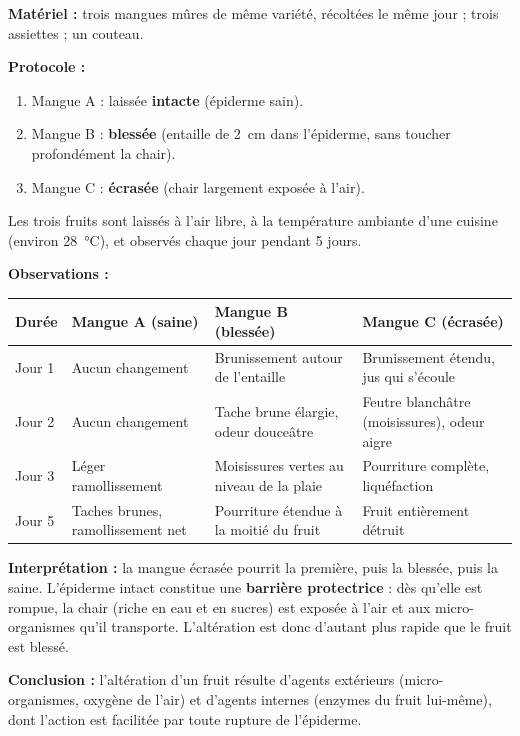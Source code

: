 \documentclass[11pt]{article}
\begin{document}
\begin{experience}
\textbf{Matériel :} trois mangues mûres de même variété, récoltées le même jour ; trois assiettes ; un couteau.

\textbf{Protocole :}
\begin{enumerate}
\item Mangue A : laissée \textbf{intacte} (épiderme sain).
\item Mangue B : \textbf{blessée} (entaille de \SI{2}{cm} dans l'épiderme, sans toucher profondément la chair).
\item Mangue C : \textbf{écrasée} (chair largement exposée à l'air).
\end{enumerate}
Les trois fruits sont laissés à l'air libre, à la température ambiante d'une cuisine (environ \SI{28}{\celsius}), et observés chaque jour pendant 5 jours.

\textbf{Observations :}
\begin{center}
\begin{tabularx}{\linewidth}{|l|X|X|X|}
\hline
\rowcolor{popblueL} \textbf{Durée} & \textbf{Mangue A (saine)} & \textbf{Mangue B (blessée)} & \textbf{Mangue C (écrasée)} \\
\hline
Jour 1 & Aucun changement & Brunissement autour de l'entaille & Brunissement étendu, jus qui s'écoule \\
\hline
Jour 2 & Aucun changement & Tache brune élargie, odeur douceâtre & Feutre blanchâtre (moisissures), odeur aigre \\
\hline
Jour 3 & Léger ramollissement & Moisissures vertes au niveau de la plaie & Pourriture complète, liquéfaction \\
\hline
Jour 5 & Taches brunes, ramollissement net & Pourriture étendue à la moitié du fruit & Fruit entièrement détruit \\
\hline
\end{tabularx}
\end{center}

\textbf{Interprétation :} la mangue écrasée pourrit la première, puis la blessée, puis la saine. L'épiderme intact constitue une \textbf{barrière protectrice} : dès qu'elle est rompue, la chair (riche en eau et en sucres) est exposée à l'air et aux micro-organismes qu'il transporte. L'altération est donc d'autant plus rapide que le fruit est blessé.

\textbf{Conclusion :} l'altération d'un fruit résulte d'agents extérieurs (micro-organismes, oxygène de l'air) et d'agents internes (enzymes du fruit lui-même), dont l'action est facilitée par toute rupture de l'épiderme.
\end{experience}
\end{document}
